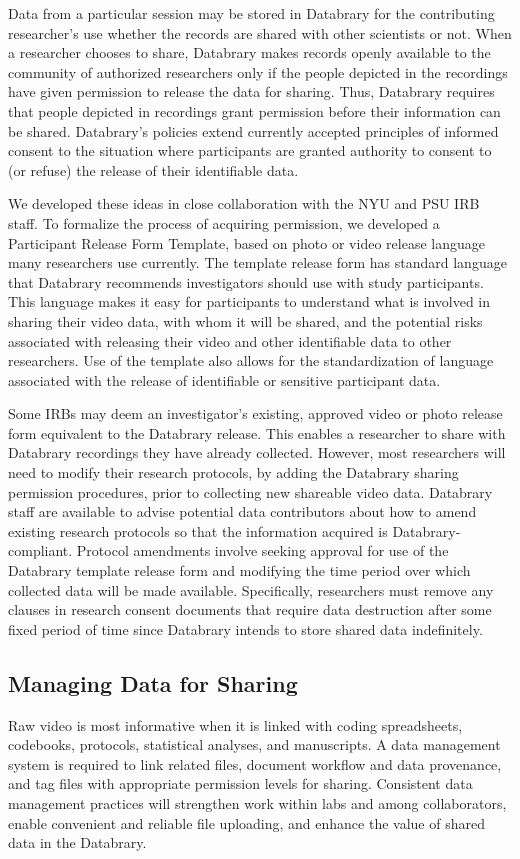 \documentclass[letterpaper,man,apacite]{apa6}
\begin{document}
Data from a particular session may be stored in Databrary for the contributing researcher’s use whether the records are shared with other scientists or not. 
When a researcher chooses to share, Databrary makes records openly available to the community of authorized researchers only if the people depicted in the recordings have given permission to release the data for sharing. 
Thus, Databrary requires that people depicted in recordings grant permission before their information can be
shared.
Databrary’s policies extend currently accepted principles of informed consent to the situation where participants are granted authority to consent to (or refuse) the release of their identifiable data.

We developed these ideas in close collaboration with the NYU and PSU IRB staff. 
To formalize the process of acquiring permission, we developed a Participant Release Form Template, based on photo or video release language many researchers use currently. 
The template release form has standard language that Databrary recommends investigators should use
with study participants. 
This language makes it easy for participants to understand what is involved in sharing their video data, with whom it will be shared, and the potential risks associated with releasing their video and other identifiable data to other researchers. 
Use of the template also allows for the standardization of language associated with the release of identifiable or sensitive participant data.

Some IRBs may deem an investigator’s existing, approved video or photo release form equivalent to the Databrary release. 
This enables a researcher to share with Databrary recordings they have already
collected. 
However, most researchers will need to modify their research protocols, by adding the Databrary sharing permission procedures, prior to collecting new shareable video data. 
Databrary staff are available to advise potential data contributors about how to amend existing research
protocols so that the information acquired is Databrary-compliant.
Protocol amendments involve seeking approval for use of the Databrary
template release form and modifying the time period over which collected
data will be made available. 
Specifically, researchers must remove any clauses in research consent documents that require data destruction
after some fixed period of time since Databrary intends to store shared
data indefinitely.

\subsection{Managing Data for Sharing}
Raw video is most informative when it is linked with coding spreadsheets, codebooks, protocols, statistical analyses, and manuscripts. 
A data management system is required to link related files, document workflow and data provenance, and tag files with appropriate permission levels for sharing. 
Consistent data management practices will strengthen work within labs and among collaborators, enable convenient and reliable file uploading, and enhance the value of shared data in the Databrary.
\end{document}
